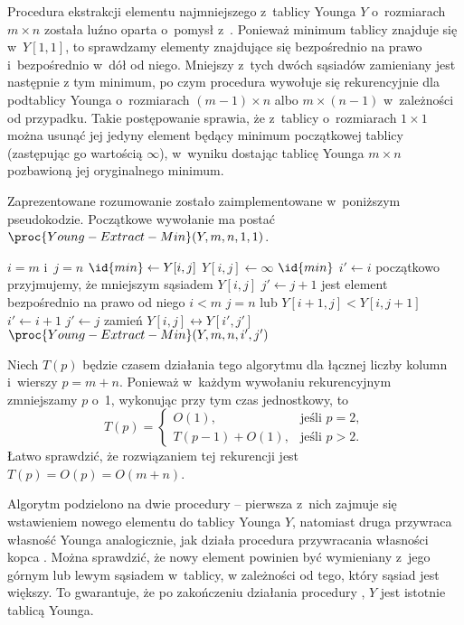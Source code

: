 \subproblem %
Procedura ekstrakcji elementu najmniejszego z~tablicy Younga $Y$ o~rozmiarach $m\times n$ została luźno oparta o~pomysł z~. Ponieważ minimum tablicy znajduje się w~$Y[1,1]$, to sprawdzamy elementy znajdujące się bezpośrednio na prawo i~bezpośrednio w~dół od niego. Mniejszy z~tych dwóch sąsiadów zamieniany jest następnie z tym minimum, po czym procedura wywołuje się rekurencyjnie dla podtablicy Younga o~rozmiarach $(m-1)\times n$ albo $m\times(n-1)$ w~zależności od przypadku. Takie postępowanie sprawia, że z~tablicy o~rozmiarach $1\times1$ można usunąć jej jedyny element będący minimum początkowej tablicy (zastępując go wartością $\infty$), w~wyniku dostając tablicę Younga $m\times n$ pozbawioną jej oryginalnego minimum.

Zaprezentowane rozumowanie zostało zaimplementowane w~poniższym pseudokodzie. Początkowe wywołanie ma postać $\proc{Young-Extract-Min}(Y,m,n,1,1)$.

\begin{codebox}
\li	\If $i=m$ i~$j=n$
\li		\Then
			$\id{min}\gets Y[i,j]$
\li			$Y[i,j]\gets\infty$
\li			\Return $\id{min}$
		\End
\li		$i'\gets i$ \>\>\>\Comment początkowo przyjmujemy, że mniejszym sąsiadem $Y[i,j]$
\li		$j'\gets j+1$ \>\>\>\> jest element bezpośrednio na prawo od niego
\li	\If $i<m$
\li		\Then
			\If $j=n$ lub $Y[i+1,j]<Y[i,j+1]$
\li				\Then
					$i'\gets i+1$
\li					$j'\gets j$
				\End
		\End
\li zamień $Y[i,j]\leftrightarrow Y[i',j']$
\li	\Return $\proc{Young-Extract-Min}(Y,m,n,i',j')$
\end{codebox}

Niech $T(p)$ będzie czasem działania tego algorytmu dla łącznej liczby kolumn i~wierszy $p=m+n$. Ponieważ w~każdym wywołaniu rekurencyjnym zmniejszamy $p$ o~1, wykonując przy tym czas jednostkowy, to
\[
	T(p) =
	\begin{cases}
		O(1), & \text{jeśli $p=2$}, \\
		T(p-1) + O(1), & \text{jeśli $p>2$}.
	\end{cases}
\]
Łatwo sprawdzić, że rozwiązaniem tej rekurencji jest $T(p)=O(p)=O(m+n)$.

\subproblem %
Algorytm podzielono na dwie procedury -- pierwsza z~nich zajmuje się wstawieniem nowego elementu do tablicy Younga $Y$, natomiast druga przywraca własność Younga analogicznie, jak działa procedura przywracania własności kopca . Można sprawdzić, że nowy element powinien być wymieniany z~jego górnym lub lewym sąsiadem w~tablicy, w zależności od tego, który sąsiad jest większy. To gwarantuje, że po zakończeniu działania procedury , $Y$ jest istotnie tablicą Younga.

